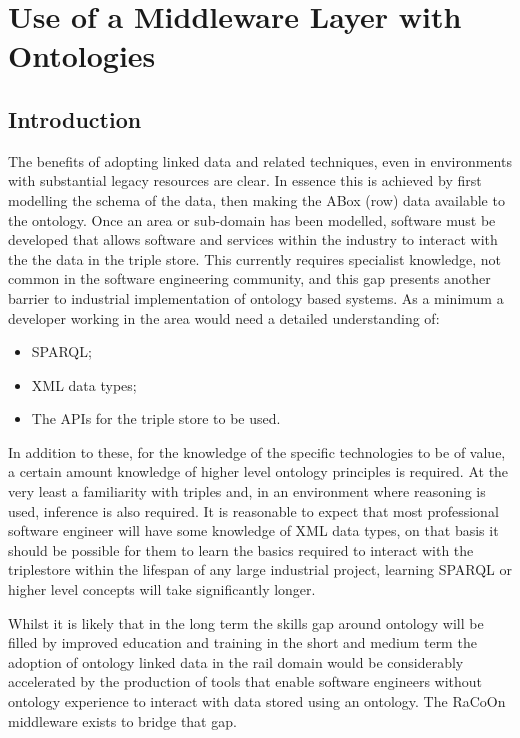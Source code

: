 \chapter{Use of a Middleware Layer with Ontologies}\label{ch:middleware}
\section{Introduction}\label{sec:mwintro}
The benefits of adopting linked data and related techniques, even in environments with substantial legacy resources are clear. In essence this is achieved by first modelling the schema of the data, then making the ABox (row) data available to the ontology. Once an area or sub-domain has been modelled, software must be developed that allows software and services within the industry to interact with the the data in the triple store. This currently requires specialist knowledge, not common in the software engineering community, and this gap presents another barrier to industrial implementation of ontology based systems. As a minimum a developer working in the area would need a detailed understanding of:
\begin{itemize}
    \item SPARQL;
    \item XML data types;
    \item The APIs for the triple store to be used.
\end{itemize}

In addition to these, for the knowledge of the specific technologies to be of value, a certain amount knowledge of higher level ontology principles is required. At the very least a familiarity with triples and, in an environment where reasoning is used, inference is also required. It is reasonable to expect that most professional software engineer will have some knowledge of XML data types, on that basis it should be possible for them to learn the basics required to interact with the triplestore within the lifespan of any large industrial project, learning SPARQL or higher level concepts will take significantly longer.

Whilst it is likely that in the long term the skills gap around ontology will be filled by improved education and training in the short and medium term the adoption of ontology linked data in the rail domain would be considerably accelerated by the production of tools that enable software engineers without ontology experience to interact with data stored using an ontology. The RaCoOn middleware exists to bridge that gap.

